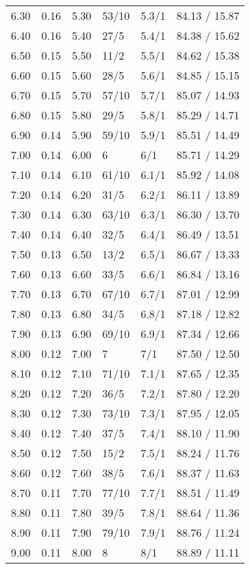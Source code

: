 \begin{longtable}{rrrlll}
  6.30 & 0.16 & 5.30 & 53/10 & 5.3/1 & 84.13 / 15.87 \\ 
  6.40 & 0.16 & 5.40 & 27/5 & 5.4/1 & 84.38 / 15.62 \\ 
  6.50 & 0.15 & 5.50 & 11/2 & 5.5/1 & 84.62 / 15.38 \\ 
  6.60 & 0.15 & 5.60 & 28/5 & 5.6/1 & 84.85 / 15.15 \\ 
  6.70 & 0.15 & 5.70 & 57/10 & 5.7/1 & 85.07 / 14.93 \\ 
  6.80 & 0.15 & 5.80 & 29/5 & 5.8/1 & 85.29 / 14.71 \\ 
  6.90 & 0.14 & 5.90 & 59/10 & 5.9/1 & 85.51 / 14.49 \\ 
  7.00 & 0.14 & 6.00 & 6 & 6/1 & 85.71 / 14.29 \\ 
  7.10 & 0.14 & 6.10 & 61/10 & 6.1/1 & 85.92 / 14.08 \\ 
  7.20 & 0.14 & 6.20 & 31/5 & 6.2/1 & 86.11 / 13.89 \\ 
  7.30 & 0.14 & 6.30 & 63/10 & 6.3/1 & 86.30 / 13.70 \\ 
  7.40 & 0.14 & 6.40 & 32/5 & 6.4/1 & 86.49 / 13.51 \\ 
  7.50 & 0.13 & 6.50 & 13/2 & 6.5/1 & 86.67 / 13.33 \\ 
  7.60 & 0.13 & 6.60 & 33/5 & 6.6/1 & 86.84 / 13.16 \\ 
  7.70 & 0.13 & 6.70 & 67/10 & 6.7/1 & 87.01 / 12.99 \\ 
  7.80 & 0.13 & 6.80 & 34/5 & 6.8/1 & 87.18 / 12.82 \\ 
  7.90 & 0.13 & 6.90 & 69/10 & 6.9/1 & 87.34 / 12.66 \\ 
  8.00 & 0.12 & 7.00 & 7 & 7/1 & 87.50 / 12.50 \\ 
  8.10 & 0.12 & 7.10 & 71/10 & 7.1/1 & 87.65 / 12.35 \\ 
  8.20 & 0.12 & 7.20 & 36/5 & 7.2/1 & 87.80 / 12.20 \\ 
  8.30 & 0.12 & 7.30 & 73/10 & 7.3/1 & 87.95 / 12.05 \\ 
  8.40 & 0.12 & 7.40 & 37/5 & 7.4/1 & 88.10 / 11.90 \\ 
  8.50 & 0.12 & 7.50 & 15/2 & 7.5/1 & 88.24 / 11.76 \\ 
  8.60 & 0.12 & 7.60 & 38/5 & 7.6/1 & 88.37 / 11.63 \\ 
  8.70 & 0.11 & 7.70 & 77/10 & 7.7/1 & 88.51 / 11.49 \\ 
  8.80 & 0.11 & 7.80 & 39/5 & 7.8/1 & 88.64 / 11.36 \\ 
  8.90 & 0.11 & 7.90 & 79/10 & 7.9/1 & 88.76 / 11.24 \\ 
  9.00 & 0.11 & 8.00 & 8 & 8/1 & 88.89 / 11.11 \\ 

\end{longtable}
